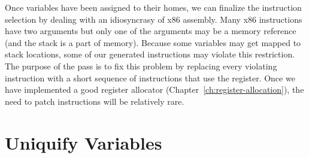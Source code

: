 \documentclass[11pt]{book}
\newcommand{\margincomment}[1]{\marginpar{#1}}
\newcommand{\margincomment}[1]{}
\begin{document}


Once variables have been assigned to their homes, we can finalize the
instruction selection by dealing with an idiosyncrasy of x86
assembly. Many x86 instructions have two arguments but only one of the
arguments may be a memory reference (and the stack is a part of
memory).  Because some variables may get mapped to stack locations,
some of our generated instructions may violate this restriction.  The
purpose of the  pass is to fix this problem by
replacing every violating instruction with a short sequence of
instructions that use the  register. Once we have implemented
a good register allocator (Chapter~\ref{ch:register-allocation}), the
need to patch instructions will be relatively rare.


\section{Uniquify Variables}
\label{sec:uniquify-s0}
\end{document}
